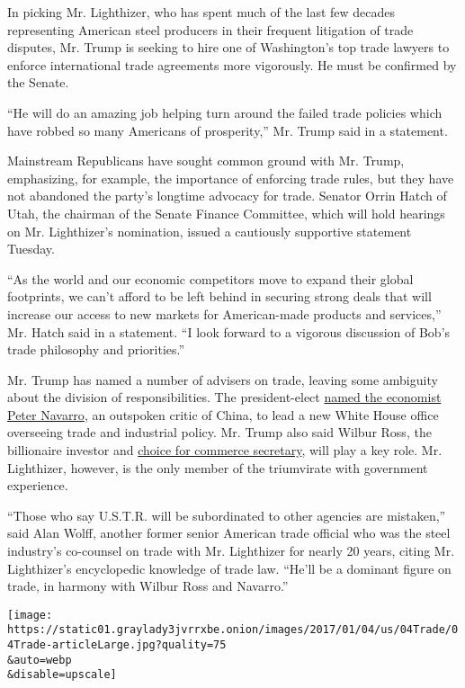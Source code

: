 In picking Mr. Lighthizer, who has spent much of the last few decades
representing American steel producers in their frequent litigation of
trade disputes, Mr. Trump is seeking to hire one of Washington's top
trade lawyers to enforce international trade agreements more vigorously.
He must be confirmed by the Senate.

``He will do an amazing job helping turn around the failed trade
policies which have robbed so many Americans of prosperity,'' Mr. Trump
said in a statement.

Mainstream Republicans have sought common ground with Mr. Trump,
emphasizing, for example, the importance of enforcing trade rules, but
they have not abandoned the party's longtime advocacy for trade. Senator
Orrin Hatch of Utah, the chairman of the Senate Finance Committee, which
will hold hearings on Mr. Lighthizer's nomination, issued a cautiously
supportive statement Tuesday.

``As the world and our economic competitors move to expand their global
footprints, we can't afford to be left behind in securing strong deals
that will increase our access to new markets for American-made products
and services,'' Mr. Hatch said in a statement. ``I look forward to a
vigorous discussion of Bob's trade philosophy and priorities.''

Mr. Trump has named a number of advisers on trade, leaving some
ambiguity about the division of responsibilities. The president-elect
\href{https://www.nytimes3xbfgragh.onion/2016/12/21/us/politics/peter-navarro-carl-icahn-trump-china-trade.html?_r=0}{named
the economist Peter Navarro}, an outspoken critic of China, to lead a
new White House office overseeing trade and industrial policy. Mr. Trump
also said Wilbur Ross, the billionaire investor and
\href{https://www.nytimes3xbfgragh.onion/2016/11/25/business/dealbook/wilbur-ross-commerce-secretary-donald-trump.html}{choice
for commerce secretary}, will play a key role. Mr. Lighthizer, however,
is the only member of the triumvirate with government experience.

``Those who say U.S.T.R. will be subordinated to other agencies are
mistaken,'' said Alan Wolff, another former senior American trade
official who was the steel industry's co-counsel on trade with Mr.
Lighthizer for nearly 20 years, citing Mr. Lighthizer's encyclopedic
knowledge of trade law. ``He'll be a dominant figure on trade, in
harmony with Wilbur Ross and Navarro.''

\texttt{[image: https://static01.graylady3jvrrxbe.onion/images/2017/01/04/us/04Trade/04Trade-articleLarge.jpg?quality=75\\\&auto=webp\\\&disable=upscale]}

